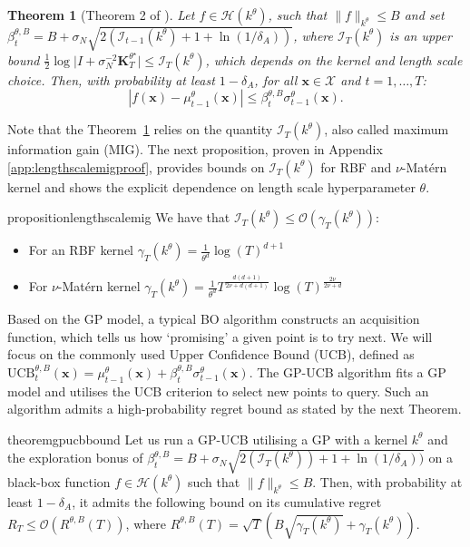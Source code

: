 \documentclass{article}
\theoremstyle{plain}
\newtheorem{theorem}{Theorem}[section]
\theoremstyle{definition}
\theoremstyle{remark}
\theoremstyle{plain}
\begin{document}
\begin{theorem}[Theorem 2 of \cite{chowdhury2017kernelized}] \label{theorem:ucb}
Let $f \in \mathcal{H}\left(k^{\theta}\right)$, such that $\lVert f \rVert_{k^{\theta}} \le B$ and set $\beta_t^{\theta, B} = B + \sigma_N \sqrt{2 (\mathcal{I}_{t-1}(k^{\theta}) + 1 + \ln (1/\delta_A))}$, where $\mathcal{I}_T(k^\theta)$ is an upper bound  $\frac{1}{2} \log \lvert I + \sigma_N^{-2} \bm{K}^{\theta^\star}_T \rvert \le \mathcal{I}_T(k^\theta)$, which depends on the kernel and length scale choice. 
Then, with probability at least $1 - \delta_A$, for all $\bm{x} \in \mathcal{X}$ and $t = 1, \dots, T$:
    \begin{equation*}
    \left|f(\bm{x}) -  \mu_{t-1}^{\theta}(\bm{x})\right| \le \beta_t^{\theta, B} \sigma_{t-1}^{\theta} (\bm{x}) .
\end{equation*}
\end{theorem}
Note that the Theorem~\ref{theorem:ucb} relies on the quantity $\mathcal{I}_T(k^\theta)$, also called maximum information gain (MIG). The next proposition, proven in Appendix \ref{app:lengthscalemigproof}, provides bounds on $\mathcal{I}_T(k^\theta)$ for RBF and $\nu$-Matérn kernel and shows the explicit dependence on length scale hyperparameter $\theta$.
\newpage
\begin{restatable}[]{proposition}{lengthscalemig}
\label{prop:lengthscalemig} We have that $\mathcal{I}_T(k^\theta) \le \mathcal{O}\left(\gamma_T(k^\theta)\right)$:
\begin{itemize}
    \item For an RBF kernel $
    \gamma_T(k^\theta) = \frac{1}{\theta^d} \log(T)^{d+1}
$
\item For $\nu$-Matérn kernel $
    \gamma_T(k^\theta) = \frac{1}{\theta^{d}} T^{\frac{d(d+1)}{2\nu + d(d+1)}}\log(T)^{\frac{2\nu}{2\nu + d}}
$
\end{itemize} 
\end{restatable}
Based on the GP model, a typical BO algorithm constructs an acquisition function, which tells us how `promising’ a given point is to try next. We will focus on the commonly used Upper Confidence Bound (UCB),  defined as 
$
    \textrm{UCB}_{t}^{\theta, B}(\bm{x}) = \mu_{t-1}^\theta (\bm{x}) + \beta_t^{\theta, B} \sigma^\theta_{t-1}(\bm{x})
$. The GP-UCB algorithm \cite{srinivas2009gaussian, chowdhury2017kernelized} fits a GP model and utilises the UCB criterion to select new points to query. Such an algorithm admits a high-probability regret bound as stated by the next Theorem.
 \begin{restatable}{theorem}{gpucbbound} \label{thm:gpucbbound}
     Let us run a GP-UCB utilising a GP with a kernel $k^\theta$ and the exploration bonus of $\beta_t^{\theta, B} = B + \sigma_N \sqrt{2 (\mathcal{I}_T(k^\theta)) + 1 + \ln (1/\delta_A))}$ on a black-box function $f \in \mathcal{H}(k^\theta)$ such that $\lVert f \rVert_{k^{\theta}} \le B$. Then, with probability at least $1-\delta_A$, it admits the following bound on its cumulative regret $R_T \le  \mathcal{O}\left(R^{\theta, B}(T)\right)$, where $R^{\theta, B}(T) = \sqrt{T} \left(B \sqrt{\gamma_T(k^\theta)} + \gamma_T(k^\theta) \right)$.
 \end{restatable}
\end{document}
